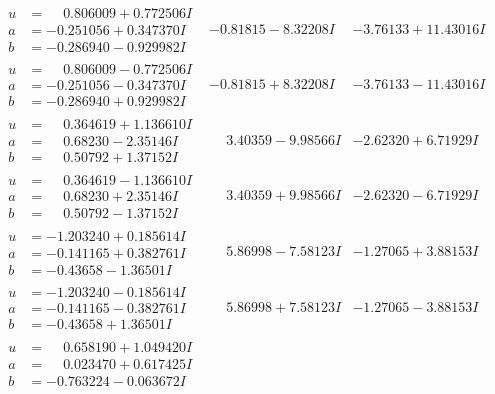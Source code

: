\documentclass[1p]{elsarticle_modified}
\theoremstyle{definition}
\begin{document}
$$\begin{array}{c|c|c}
\begin{aligned}
u &= \phantom{-}0.806009 + 0.772506 I \\
a &= -0.251056 + 0.347370 I \\
b &= -0.286940 - 0.929982 I\end{aligned}
 & -0.81815 - 8.32208 I & -3.76133 + 11.43016 I \\ \hline\begin{aligned}
u &= \phantom{-}0.806009 - 0.772506 I \\
a &= -0.251056 - 0.347370 I \\
b &= -0.286940 + 0.929982 I\end{aligned}
 & -0.81815 + 8.32208 I & -3.76133 - 11.43016 I \\ \hline\begin{aligned}
u &= \phantom{-}0.364619 + 1.136610 I \\
a &= \phantom{-}0.68230 - 2.35146 I \\
b &= \phantom{-}0.50792 + 1.37152 I\end{aligned}
 & \phantom{-}3.40359 - 9.98566 I & -2.62320 + 6.71929 I \\ \hline\begin{aligned}
u &= \phantom{-}0.364619 - 1.136610 I \\
a &= \phantom{-}0.68230 + 2.35146 I \\
b &= \phantom{-}0.50792 - 1.37152 I\end{aligned}
 & \phantom{-}3.40359 + 9.98566 I & -2.62320 - 6.71929 I \\ \hline\begin{aligned}
u &= -1.203240 + 0.185614 I \\
a &= -0.141165 + 0.382761 I \\
b &= -0.43658 - 1.36501 I\end{aligned}
 & \phantom{-}5.86998 - 7.58123 I & -1.27065 + 3.88153 I \\ \hline\begin{aligned}
u &= -1.203240 - 0.185614 I \\
a &= -0.141165 - 0.382761 I \\
b &= -0.43658 + 1.36501 I\end{aligned}
 & \phantom{-}5.86998 + 7.58123 I & -1.27065 - 3.88153 I \\ \hline\begin{aligned}
u &= \phantom{-}0.658190 + 1.049420 I \\
a &= \phantom{-}0.023470 + 0.617425 I \\
b &= -0.763224 - 0.063672 I\end{aligned}

\end{array}$$
\end{document}
